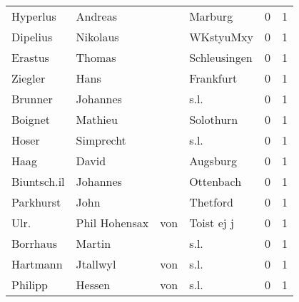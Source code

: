 \begin{center}
\begin{tiny}
\begin{longtabu}{llllrr}
                 Hyperlus &                            Andreas &             &                                     Marburg &          0 &         1 \\
                 Dipelius &                           Nikolaus &             &                                   WKstyuMxy &          0 &         1 \\
                  Erastus &                             Thomas &             &                                Schleusingen &          0 &         1 \\
                  Ziegler &                               Hans &             &                                   Frankfurt &          0 &         1 \\
                  Brunner &                           Johannes &             &                                        s.l. &          0 &         1 \\
                  Boignet &                            Mathieu &             &                                   Solothurn &          0 &         1 \\
                    Hoser &                          Simprecht &             &                                        s.l. &          0 &         1 \\
                     Haag &                              David &             &                                    Augsburg &          0 &         1 \\
              Biuntsch.il &                           Johannes &             &                                   Ottenbach &          0 &         1 \\
                Parkhurst &                               John &             &                                    Thetford &          0 &         1 \\
                     Ulr. &                     Phil  Hohensax &         von &                                  Toist ej j &          0 &         1 \\
                 Borrhaus &                             Martin &             &                                        s.l. &          0 &         1 \\
                 Hartmann &                           Jtallwyl &         von &                                        s.l. &          0 &         1 \\
                  Philipp &                             Hessen &         von &                                        s.l. &          0 &         1 \\

\end{longtabu}
\end{tiny}
\end{center}
